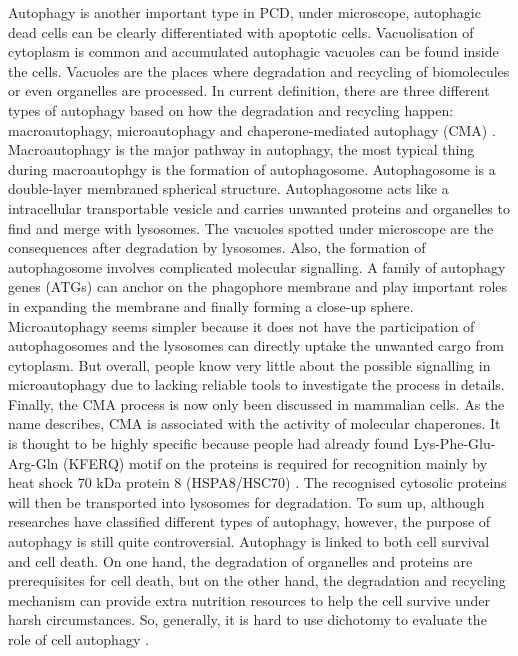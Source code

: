 Autophagy is another important type in PCD, under microscope, autophagic dead cells can be clearly differentiated with apoptotic cells. Vacuolisation of cytoplasm is common and accumulated autophagic vacuoles can be found inside the cells. Vacuoles are the places where degradation and recycling of biomolecules or even organelles are processed. In current definition, there are three different types of autophagy based on how the degradation and recycling happen: macroautophagy, microautophagy and chaperone-mediated autophagy (CMA) \citep{parzych2014overview}. Macroautophagy is the major pathway in autophagy, the most typical thing during macroautophgy is the formation of autophagosome. Autophagosome is a double-layer membraned spherical structure. Autophagosome acts like a intracellular transportable vesicle and carries unwanted proteins and organelles to find and merge with lysosomes. The vacuoles spotted under microscope are the consequences after degradation by lysosomes. Also, the formation of autophagosome involves complicated molecular signalling. A family of autophagy genes (ATGs) can anchor on the phagophore membrane and play important roles in expanding the membrane and finally forming a close-up sphere. Microautophagy seems simpler because it does not have the participation of autophagosomes and the lysosomes can directly uptake the unwanted cargo from cytoplasm. But overall, people know very little about the possible signalling in microautophagy due to lacking reliable tools to investigate the process in details. Finally, the CMA process is now only been discussed in mammalian cells. As the name describes, CMA is associated with the activity of molecular chaperones. It is thought to be highly specific because people had already found Lys-Phe-Glu-Arg-Gln (KFERQ) motif on the proteins is required for recognition mainly by heat shock 70 kDa protein 8 (HSPA8/HSC70) \citep{dice1990peptide}. The recognised cytosolic proteins will then be transported into lysosomes for degradation. To sum up, although researches have classified different types of autophagy, however, the purpose of autophagy is still quite controversial. Autophagy is linked to both cell survival and cell death. On one hand, the degradation of organelles and proteins are prerequisites for cell death, but on the other hand, the degradation and recycling mechanism can provide extra nutrition resources to help the cell survive under harsh circumstances. So, generally, it is hard to use dichotomy to evaluate the role of cell autophagy \citep{bergmann2007autophagy, hippert2006autophagy}.\\
